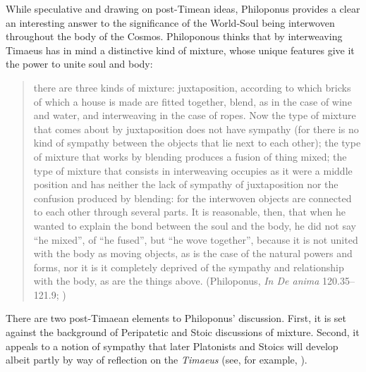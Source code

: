 While speculative and drawing on post-Timean ideas, Philoponus provides a clear an interesting answer to the significance of the World-Soul being interwoven throughout the body of the Cosmos. Philoponous thinks that by interweaving Timaeus has in mind a distinctive kind of mixture, whose unique features give it the power to unite soul and body:
\begin{quote}
	there are three kinds of mixture: juxtaposition, according to which bricks of which a house is made are fitted together, blend, as in the case of wine and water, and interweaving in the case of ropes. Now the type of mixture that comes about by juxtaposition does not have sympathy (for there is no kind of sympathy between the objects that lie next to each other); the type of mixture that works by blending produces a fusion of thing mixed; the type of mixture that consists in interweaving occupies as it were a middle position and has neither the lack of sympathy of juxtaposition nor the confusion produced by blending: for the interwoven objects are connected to each other through several parts. It is reasonable, then, that when he wanted to explain the bond between the soul and the body, he did not say ``he mixed'', of ``he fused'', but ``he wove together'', because it is not united with the body as moving objects, as is the case of the natural powers and forms, nor it is it completely deprived of the sympathy and relationship with the body, as are the things above. (Philoponus, \emph{In De anima} 120.35--121.9; \citealt[41]{Eijk:2006by})
\end{quote} 
There are two post-Timaean elements to Philoponus' discussion. First, it is set against the background of Peripatetic and Stoic discussions of mixture. Second, it appeals to a notion of sympathy that later Platonists and Stoics will develop albeit partly by way of reflection on the \emph{Timaeus} (see, for example, \citealt{Emilsson:2015wf}). 

